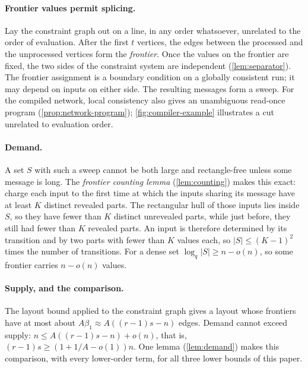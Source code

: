 \documentclass[11pt]{article}
\theoremstyle{plain}
\theoremstyle{definition}
\theoremstyle{remark}
\newcommand{\card}[1]{\lvert #1\rvert}
\begin{document}
\paragraph{Frontier values permit splicing.}
Lay the constraint graph out on a line, in any order whatsoever, unrelated to the order of
evaluation. After the first $t$ vertices, the edges between the processed and the unprocessed
vertices form the \emph{frontier}. Once the values on the frontier are fixed, the two sides of
the constraint system are independent (\cref{lem:separator}). The frontier assignment is a
boundary condition on a globally consistent run; it may depend on inputs on either side.
The resulting messages form a sweep. For the compiled network, local consistency also gives
an unambiguous read-once program (\cref{prop:network-program}); \cref{fig:compiler-example}
illustrates a cut unrelated to evaluation order.

\paragraph{Demand.}
A set $S$ with such a sweep cannot be both large and rectangle-free unless some message
is long. The \emph{frontier counting lemma} (\cref{lem:counting}) makes this exact: charge each
input to the first time at which the inputs sharing its message have at least $K$ distinct
revealed parts. The rectangular hull of those inputs lies inside $S$, so they have fewer than $K$ distinct
unrevealed parts, while just before, they still had fewer than $K$ revealed parts. An input is
therefore determined by its transition and by two parts with fewer than $K$ values each, so
$\card S \le (K - 1)^2$ times the number of transitions. For a dense set
$\log_q\card S \ge n - o(n)$, so some frontier carries $n - o(n)$ values.

\paragraph{Supply, and the comparison.}
The layout bound applied to the constraint graph gives a layout whose frontiers have at most
about $A\beta_1 \approx A((r-1)s - n)$ edges. Demand cannot exceed supply:
$n \le A((r-1)s - n) + o(n)$, that is, $(r-1)s \ge (1 + 1/A - o(1))n$. One lemma
(\cref{lem:demand}) makes this comparison, with every lower-order term, for all three lower
bounds of this paper.
\end{document}
